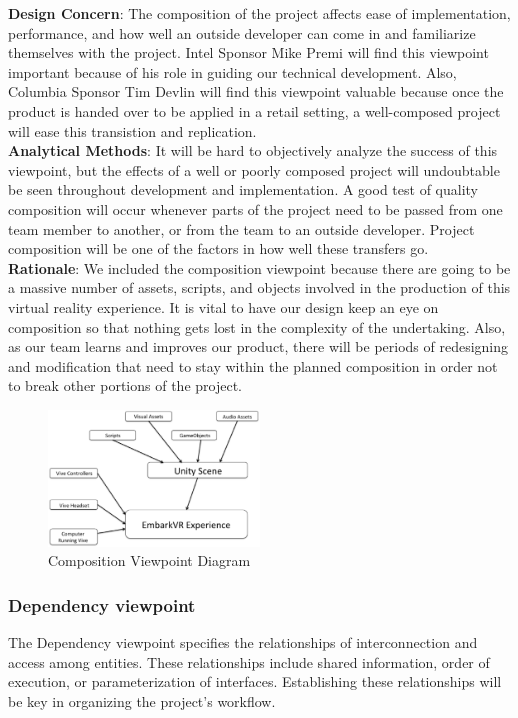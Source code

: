 \documentclass[10pt,journal,compsoc,onecolumn, draftclsnofoot]{IEEEtran}
\begin{document}
\hangindent=0.5cm \textbf{Design Concern}: The composition of the project affects ease of implementation, performance, and how well an outside developer can come in
and familiarize themselves with the project. Intel Sponsor Mike Premi will
find this viewpoint important because of his role in guiding our technical
development. Also, Columbia Sponsor Tim Devlin will find this viewpoint
valuable because once the product is handed over to be applied in a retail
setting, a well-composed project will ease this transistion and replication.\\

\hangindent=0.5cm \textbf{Analytical Methods}: It will be hard to objectively analyze the success of this viewpoint, but the effects of a well or poorly composed project will
undoubtable be seen throughout development and implementation. A good test of
quality composition will occur whenever parts of the project need to be
passed from one team member to another, or from the team to an outside
developer. Project composition will be one of the factors in how well these
transfers go.\\

\hangindent=0.5cm \textbf{Rationale}: We included the composition viewpoint because there are going to be a massive number of assets, scripts, and objects involved in the
production of this virtual reality experience. It is vital to have our design
keep an eye on composition so that nothing gets lost in the complexity of the
undertaking. Also, as our team learns and improves our product, there will be
periods of redesigning and modification that need to stay within the planned
composition in order not to break other portions of the project.

\begin{figure}[h]
\centering
\caption{Composition Viewpoint Diagram}
\includegraphics[width=0.5\textwidth]{projectComposition.eps}
\end{figure}
\subsubsection{Dependency viewpoint}
The Dependency viewpoint specifies the relationships of interconnection and access among entities. These relationships include shared information, order of execution, or parameterization of interfaces. Establishing these relationships will be key in organizing the project's workflow.\\
\end{document}
